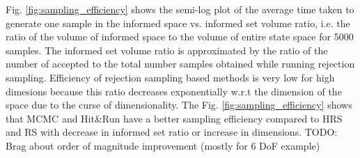 \documentclass[letterpaper, 10 pt, conference]{ieeeconf}  %
\begin{document}
Fig. \ref{fig:sampling_efficiency} shows the semi-log plot of the average time taken to generate one sample in the informed space vs. informed set volume ratio, i.e. the ratio of the volume of informed space to the volume of entire state space for 5000 samples. The informed set volume ratio is approximated by the ratio of the number of accepted to the total number samples obtained while running rejection sampling. Efficiency of rejection sampling based methods is very low for high dimesions because this ratio decreases exponentially w.r.t the dimension of the space due to the curse of dimensionality. The Fig. \ref{fig:sampling_efficiency} shows that MCMC and Hit\&Run have a better sampling efficiency compared to HRS and RS with decrease in informed set ratio or increase in dimensions. TODO: Brag about order of magnitude improvement (mostly for 6 DoF example)
\end{document}
